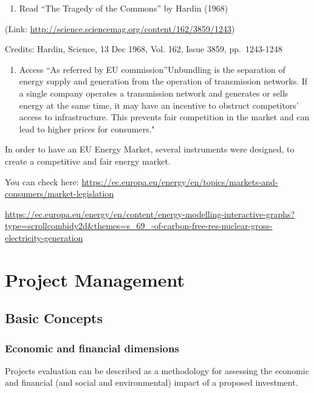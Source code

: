 \documentclass[]{book}
\providecommand{\tightlist}{%
  \setlength{\itemsep}{0pt}\setlength{\parskip}{0pt}}
\theoremstyle{definition}
\theoremstyle{definition}
\theoremstyle{definition}
\theoremstyle{remark}
\begin{document}
\begin{enumerate}
\def\labelenumi{\arabic{enumi}.}
\tightlist
\item
  Read ``The Tragedy of the Commons'' by Hardin (1968)
\end{enumerate}

(Link: \url{http://science.sciencemag.org/content/162/3859/1243})

Credits: Hardin, Science, 13 Dec 1968, Vol. 162, Issue 3859,
pp.~1243-1248

\begin{enumerate}
\def\labelenumi{\arabic{enumi}.}
\setcounter{enumi}{1}
\tightlist
\item
  Access ``As referred by EU commission''Unbundling is the separation of
  energy supply and generation from the operation of transmission
  networks. If a single company operates a transmission network and
  generates or sells energy at the same time, it may have an incentive
  to obstruct competitors' access to infrastructure. This prevents fair
  competition in the market and can lead to higher prices for
  consumers."
\end{enumerate}

In order to have an EU Energy Market, several instruments were designed,
to create a competitive and fair energy market.

You can check here:
\url{https://ec.europa.eu/energy/en/topics/markets-and-consumers/market-legislation}

\url{https://ec.europa.eu/energy/en/content/energy-modelling-interactive-graphs?type=scrollcombidy2d\&themes=s_69_-of-carbon-free-res-nuclear-gross-electricity-generation}

\chapter{Project Management}\label{project-management-1}

\section{Basic Concepts}\label{basic-concepts}

\subsection{Economic and financial
dimensions}\label{economic-and-financial-dimensions}

Projects evaluation can be described as a methodology for assessing the
economic and financial (and social and environmental) impact of a
proposed investment.
\end{document}

